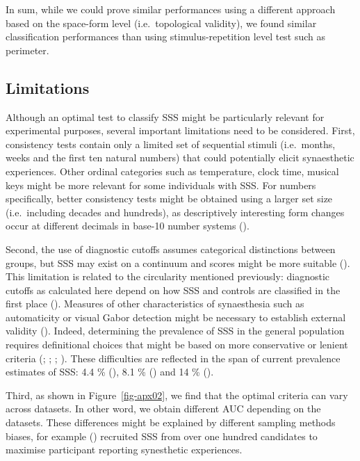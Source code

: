 \documentclass[
  man,
  floatsintext,
  longtable,
  a4paper,
  nolmodern,
  notxfonts,
  notimes,
  colorlinks=true,linkcolor=blue,citecolor=blue,urlcolor=blue]{apa7}
\begin{document}
In sum, while we could prove similar performances using a different
approach based on the space-form level (i.e.~topological validity), we
found similar classification performances than using stimulus-repetition
level test such as perimeter.

\subsection{Limitations}\label{sec-limitations}

Although an optimal test to classify SSS might be particularly relevant
for experimental purposes, several important limitations need to be
considered. First, consistency tests contain only a limited set of
sequential stimuli (i.e.~months, weeks and the first ten natural
numbers) that could potentially elicit synaesthetic experiences. Other
ordinal categories such as temperature, clock time, musical keys might
be more relevant for some individuals with SSS. For numbers
specifically, better consistency tests might be obtained using a larger
set size (i.e.~including decades and hundreds), as descriptively
interesting form changes occur at different decimals in base-10 number
systems ().

Second, the use of diagnostic cutoffs assumes categorical distinctions
between groups, but SSS may exist on a continuum and scores might be
more suitable (). This
limitation is related to the circularity mentioned previously:
diagnostic cutoffs as calculated here depend on how SSS and controls are
classified in the first place ().
Measures of other characteristics of synaesthesia such as automaticity
or visual Gabor detection might be necessary to establish external
validity (). Indeed,
determining the prevalence of SSS in the general population requires
definitional choices that might be based on more conservative or lenient
criteria (;
;
;
). These difficulties are
reflected in the span of current prevalence estimates of SSS: 4.4 \%
(), 8.1 \%
() and 14 \%
().

Third, as shown in Figure~\ref{fig-apx02}, we find that the optimal
criteria can vary across datasets. In other word, we obtain different
AUC depending on the datasets. These differences might be explained by
different sampling methods biases, for example
() recruited
SSS from over one hundred candidates to maximise participant reporting
synesthetic experiences.
\end{document}
